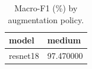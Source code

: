 \begin{table}[t]
\centering
\caption{Macro-F1 (\%) by augmentation policy.}
\label{tab:ablation_augmentation}
\begin{tabular}{ll}
\toprule
model & medium \\
\midrule
resnet18 & 97.470000 \\
\bottomrule
\end{tabular}
\end{table}

